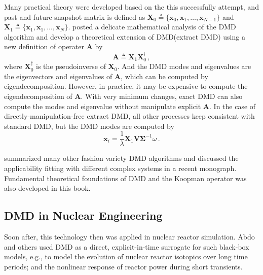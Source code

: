 Many practical theory were developed based on the this successfully attempt, and past and future snapshot matrix is defined as $\mathbf{X}_0 \triangleq \{\mathbf{x}_0, \mathbf{x}_1, \ldots, \mathbf{x}_{N-1} \}$ and $\mathbf{X}_1 \triangleq \{\mathbf{x}_1, \mathbf{x}_1, \ldots, \mathbf{x}_{N} \} $. 
\citet{tu_dynamic_2014} posted a delicate mathematical analysis of the DMD algorithm and develop a theoretical extension of DMD(extract DMD) using a new definition of operater $\mathbf{A}$ by    
\begin{equation}
 \mathbf{A}\triangleq \mathbf{X}_1  \mathbf{X}_0^{\dagger}\, ,
 \label{eq:exact_dmd}
\end{equation}
where $\mathbf{X}_0^{\dagger}$ is the pseudoinverse of $\mathbf{X}_0$. And the DMD modes and
eigenvalues are the eigenvectors and eigenvalues of $\mathbf{A}$, which can be computed by eigendecomposition. However, in practice, it may be expensive to compute the eigendecomposition of $\mathbf{A}$. With very minimum changes, exact DMD can also compute the modes and eigenvalue without manipulate explicit $\mathbf{A}$. In the case of directly-manipulation-free extract DMD, all other processes keep consistent with standard DMD, but the DMD modes are computed by 
\begin{equation}
 \mathbf{\mathbf{x}}_i = \frac{1}{\lambda} \mathbf{X}_1 \mathbf{V} \mathbf{\Sigma}^{-1} \omega \, .
 \label{eq:exact_dmd_free}
\end{equation}

\citet{kutz_dynamic_2016} summarized many other fashion variety DMD algorithms and discussed the applicability fitting with different complex systems in a recent monograph.
Fundamental theoretical foundations of DMD and the Koopman operator was also developed in this book.

\subsection{DMD in Nuclear Engineering}
Soon after, this technology then was applied in nuclear reactor simulation. 
Abdo and others used DMD as a direct, explicit-in-time surrogate for such black-box models, e.g., to model the evolution of nuclear reactor isotopics over long time periods; and the nonlinear response of reactor power during short transients.\cite{abdo_data-driven_2018}\cite{abdo_modeling_2019}\cite{elzohery2018comparison}

